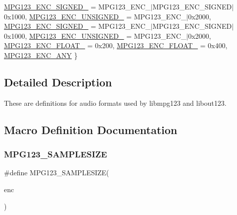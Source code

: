 \begin{DoxyCompactItemize}
\newline
\mbox{\hyperlink{group__mpg123__enc_ggafc8cdd60a8d3c30a09249869d835c634ab084e4c2405cdf715276ae057cf9fafe}{M\+P\+G123\+\_\+\+E\+N\+C\+\_\+\+S\+I\+G\+N\+E\+D\+\_}} = M\+P\+G123\+\_\+\+E\+N\+C\+\_$\vert$\+M\+P\+G123\+\_\+\+E\+N\+C\+\_\+\+S\+I\+G\+N\+E\+D$\vert$0x1000, 
\mbox{\hyperlink{group__mpg123__enc_ggafc8cdd60a8d3c30a09249869d835c634a02b0b9f899858a0e2547b84a001fcee9}{M\+P\+G123\+\_\+\+E\+N\+C\+\_\+\+U\+N\+S\+I\+G\+N\+E\+D\+\_}} = M\+P\+G123\+\_\+\+E\+N\+C\+\_$\vert$0x2000, 
\mbox{\hyperlink{group__mpg123__enc_ggafc8cdd60a8d3c30a09249869d835c634a48a46f55ca764958182a4a5d2f1df6be}{M\+P\+G123\+\_\+\+E\+N\+C\+\_\+\+S\+I\+G\+N\+E\+D\+\_}} = M\+P\+G123\+\_\+\+E\+N\+C\+\_$\vert$\+M\+P\+G123\+\_\+\+E\+N\+C\+\_\+\+S\+I\+G\+N\+E\+D$\vert$0x1000, 
\mbox{\hyperlink{group__mpg123__enc_ggafc8cdd60a8d3c30a09249869d835c634a1e1395393b5135a0d1f1d0067ab31138}{M\+P\+G123\+\_\+\+E\+N\+C\+\_\+\+U\+N\+S\+I\+G\+N\+E\+D\+\_}} = M\+P\+G123\+\_\+\+E\+N\+C\+\_$\vert$0x2000, 
\newline
\mbox{\hyperlink{group__mpg123__enc_ggafc8cdd60a8d3c30a09249869d835c634afee3f81a5b7f53cd8a1613e05b942fd7}{M\+P\+G123\+\_\+\+E\+N\+C\+\_\+\+F\+L\+O\+A\+T\+\_}} = 0x200, 
\mbox{\hyperlink{group__mpg123__enc_ggafc8cdd60a8d3c30a09249869d835c634a883909122437922b880cedac94035829}{M\+P\+G123\+\_\+\+E\+N\+C\+\_\+\+F\+L\+O\+A\+T\+\_}} = 0x400, 
\mbox{\hyperlink{group__mpg123__enc_ggafc8cdd60a8d3c30a09249869d835c634a25e4ffefb31c8b40fe30e57790427987}{M\+P\+G123\+\_\+\+E\+N\+C\+\_\+\+A\+NY}}
 \}
\end{DoxyCompactItemize}


\subsection{Detailed Description}
These are definitions for audio formats used by libmpg123 and libout123. 

\subsection{Macro Definition Documentation}
\mbox{\label{group__mpg123__enc_gafa4071cca43ad223f5f2aea092b1b045}} 
\subsubsection{\texorpdfstring{MPG123\_SAMPLESIZE}{MPG123\_SAMPLESIZE}}
{\footnotesize\ttfamily \#define M\+P\+G123\+\_\+\+S\+A\+M\+P\+L\+E\+S\+I\+ZE(\begin{DoxyParamCaption}\item[{}]{enc }\end{DoxyParamCaption})}

